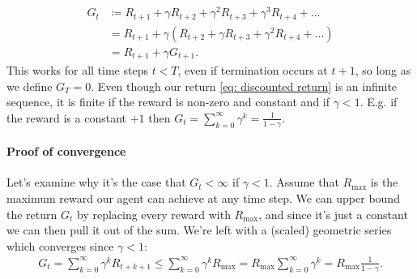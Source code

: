 \documentclass[12pt]{article}
\begin{document}
\begin{align}
  G_t &\coloneqq R_{t+1} + \gamma R_{t+2} + \gamma^2 R_{t+3} + \gamma^3 R_{t+4}         + \ldots \nonumber \\
      &= R_{t+1} + \gamma \left(R_{t+2} + \gamma R_{t+3} + \gamma^2 R_{t+4} +                 \ldots \right) \nonumber \\
  \label{eq: recursivereturnformulation}
      &= R_{t+1} + \gamma G_{t+1}.
\end{align}
This works for all time steps $t<T$, even if termination occurs at $t+1$, so long as we define $G_T = 0$. Even though our return \ref{eq: discounted return}
is an infinite sequence, it is finite if the reward is non-zero and constant and if $\gamma < 1$. E.g. if the reward is a constant $+1$ then $G_t = \sum_{k=0}^{\infty} \gamma^k = \frac{1}{1-\gamma}$.

\paragraph{Proof of convergence} Let's examine why it's the case that $G_t < \infty$ if $\gamma < 1$. Assume that $R_{\textrm{max}}$ is the maximum reward our agent can achieve at any time step. We can upper bound the return $G_t$ by replacing every reward with $R_{\textrm{max}}$, and since it's just a constant we can then pull it out of the sum. We're left with a (scaled) geometric series which converges since $\gamma < 1$:
\begin{align*}
  G_t = \sum_{k=0}^{\infty} \gamma^k R_{t+k+1} \leq \sum_{k=0}^\infty \gamma^k R_{\textrm{max}} = R_{\textrm{max}} \sum_{k=0}^\infty \gamma^k = R_{\textrm{max}} \frac{1}{1-\gamma}.
\end{align*}
\end{document}
